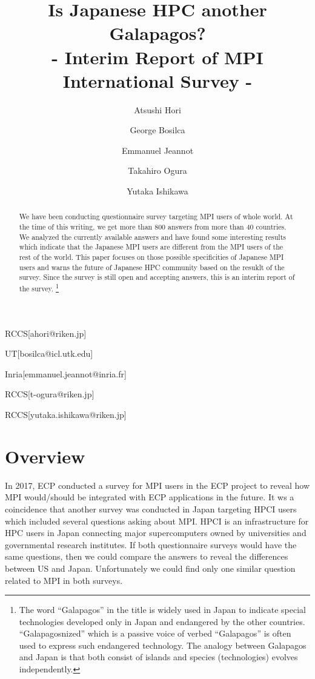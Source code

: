 \documentclass[submit,techrep,noauthor,english]{ipsj}
\begin{document}
\title{Is Japanese HPC another Galapagos?\\
- Interim Report of MPI International Survey -}


\author{Atsushi Hori}{RCCS}[ahori@riken.jp]
\author{George Bosilca}{UT}[bosilca@icl.utk.edu]
\author{Emmanuel Jeannot}{Inria}[emmanuel.jeannot@inria.fr]
\author{Takahiro Ogura}{RCCS}[t-ogura@riken.jp]
\author{Yutaka Ishikawa}{RCCS}[yutaka.ishikawa@riken.jp]

\begin{abstract}
We have been conducting questionnaire survey targeting MPI users of
whole world.  At the time of this writing, we get more than 800
answers from more than 40 countries.
We analyzed the currently available answers and have found some
interesting results which indicate that the Japanese MPI users are
different from the MPI users of the rest of the world. This paper focuses
on those possible specificities of Japanese MPI users and warns
the future of Japanese HPC community based on the resuklt of the
survey. Since the survey is still open and accepting answers, this is
an interim report of the survey. 
\footnote{The word ``Galapagos'' in the title is widely used in Japan to
indicate special technologies developed only in Japan and endangered
by the other countries.  ``Galapagosnized'' which is a passive voice of
verbed ``Galapagos'' is often used to express such endangered
technology.  The analogy between Galapagos and Japan is
that both consist of islands and species (technologies) evolves
independently.}
\end{abstract}

\maketitle

\section{Overview}

In 2017, ECP\cite{ECP} conducted a survey for MPI users in the ECP
project to reveal how MPI would/should be integrated with ECP
applications in the future\cite{osti_1462877}.  It ws a coincidence
that another survey was conducted in Japan targeting HPCI\cite{HPCI}
users which included several questions asking about
MPI\cite{hpci-user-survey}.  HPCI is an infrastructure for HPC users
in Japan connecting major supercomputers owned by universities and
governmental research institutes. If both questionnaire surveys would
have the same questions, then we could compare the answers to reveal
the differences between US and Japan. Unfortunately we could find only
one similar question related to MPI in both surveys.
\end{document}
